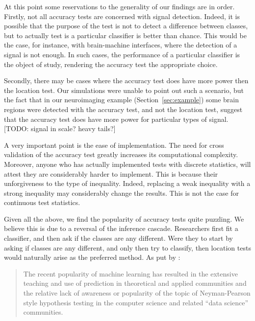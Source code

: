 \documentclass[12pt,a4paper]{article}
\begin{document}
At this point some reservations to the generality of our findings are in order. 
Firstly, not all accuracy tests are concerned with signal detection.
Indeed, it is possible that the purpose of the test is not to detect a difference between classes, but to actually test is a particular classifier is better than chance. 
This would be the case, for instance, with brain-machine interfaces, where the detection of a signal is not enough. In such cases, the performance of a particular classifier is the object of study, rendering the accuracy test the appropriate choice. 

Secondly, there may be cases where the accuracy test does have more power then the location test. 
Our simulations were unable to point out such a scenario, but the fact that in our neuroimaging example (Section~\ref{sec:example}) some brain regions were detected with the accuracy test, and not the location test, suggest that the accuracy test does have more power for particular types of signal. 
[TODO: signal in scale? heavy tails?]

A very important point is the ease of implementation. The need for cross validation of the accuracy test greatly increases its computational complexity. 
Moreover, anyone who has actually implemented tests with discrete statistics, will attest they are considerably harder to implement. This is because their unforgiveness to the type of inequality. Indeed, replacing a weak inequality with a strong inequality may considerably change the results. This is not the case for continuous test statistics. 


Given all the above, we find the popularity of accuracy tests quite puzzling. 
We believe this is due to a reversal of the inference cascade. 
Researchers first fit a classifier, and then ask if the classes are any different.
Were they to start by asking if classes are any different, and only then try to classify, then location tests would naturally arise as the preferred method. 
As put by \cite{ramdas_classification_2016}:
\begin{quote}
The recent popularity of machine learning has resulted in the extensive teaching and use
of prediction in theoretical and applied communities and the relative lack of awareness or
popularity of the topic of Neyman-Pearson style hypothesis testing in the computer science
and related ``data science'' communities.
\end{quote}
\end{document}
